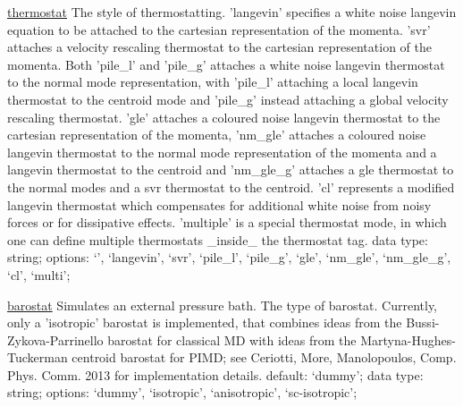 \begin{ipifield}{}
\begin{ipifield}{\hyperref[THERMOSTATS]{thermostat}}
{{The style of thermostatting. 'langevin' specifies a white noise langevin equation to be attached to the cartesian representation of the momenta. 'svr' attaches a velocity rescaling thermostat to the cartesian representation of the momenta. Both 'pile\_l' and 'pile\_g' attaches a white noise langevin thermostat to the normal mode representation, with 'pile\_l' attaching a local langevin thermostat to the centroid mode and 'pile\_g' instead attaching a global velocity rescaling thermostat. 'gle' attaches a coloured noise langevin thermostat to the cartesian representation of the momenta, 'nm\_gle' attaches a coloured noise langevin thermostat to the normal mode representation of the momenta and a langevin thermostat to the centroid and 'nm\_gle\_g' attaches a gle thermostat to the normal modes and a svr thermostat to the centroid. 'cl' represents a modified langevin thermostat which compensates for additional white noise from noisy forces or for dissipative effects. 'multiple' is a special thermostat mode, in which one can define multiple thermostats \_inside\_ the thermostat tag.}%
{data type: string; options: `', `langevin', `svr', `pile\_l', `pile\_g', `gle', `nm\_gle', `nm\_gle\_g', `cl', `multi'; }%
}
\end{ipifield}
\begin{ipifield}{\hyperref[BAROSTAT]{barostat}}%
{Simulates an external pressure bath.}%
{}%
{%
{The type of barostat.  Currently, only a 'isotropic' barostat is implemented, that combines
                                    ideas from the Bussi-Zykova-Parrinello barostat for classical MD with ideas from the
                                    Martyna-Hughes-Tuckerman centroid barostat for PIMD; see Ceriotti, More, Manolopoulos, Comp. Phys. Comm. 2013 for
                                    implementation details.}%
{default: `dummy'; data type: string; options: `dummy', `isotropic', `anisotropic', `sc-isotropic'; }%
}
\end{ipifield}
\end{ipifield}

